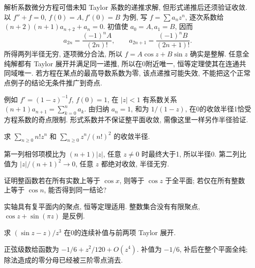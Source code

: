 解析系数微分方程可借未知 Taylor 系数的递推求解, 但形式递推后还须验证收敛. 以 $f''+f=0$, $f(0)=A,f'(0)=B$ 为例, 写 $f=\sum a_nz^n$, 逐次系数给 $(n+2)(n+1)a_{n+2}+a_n=0$. 初值使 $a_0=A,a_1=B$, 因而
\[
a_{2n}=\frac{(-1)^nA}{(2n)!},\qquad
 a_{2n+1}=\frac{(-1)^nB}{(2n+1)!}.
\]
所得两列半径无穷, 逐项微分合法, 所以 $f=A\cos z+B\sin z$ 确实是整解. 任意全纯解都有 Taylor 展开并满足同一递推, 所以在0附近唯一, 恒等定理使其在连通共同域唯一. 若方程在某点的最高导数系数为零, 该点递推可能失效, 不能把这个正常点例子的结论无条件推广到奇点.

例如 $f'=(1-z)^{-1}f$, $f(0)=1$, 在 $|z|<1$ 有系数关系 $(n+1)a_{n+1}=\sum_{k=0}^na_k$. 由归纳 $a_n=1$, 和为 $1/(1-z)$, 在0的收敛半径1恰受方程系数的奇点限制. 形式系数并不保证整平面收敛, 需像这里一样另作半径验证.

\begin{exercise}
求 $\sum_{n\ge0}n!z^n$ 和 $\sum_{n\ge0}z^n/(n!)^2$ 的收敛半径.
\end{exercise}
\begin{solution}
第一列相邻项模比为 $(n+1)|z|$, 任意 $z\ne0$ 时最终大于1, 所以半径0. 第二列比值为 $|z|/(n+1)^2\to0$, 任意 $z$ 都绝对收敛, 半径无穷.
\end{solution}
\begin{exercise}
证明整函数若在所有实数上等于 $\cos x$, 则等于 $\cos z$ 于全平面; 若仅在所有整数上等于 $\cos n$, 能否得到同一结论?
\end{exercise}
\begin{solution}
实轴具有复平面内的聚点, 恒等定理适用. 整数集合没有有限聚点, $\cos z+\sin(\pi z)$ 是反例.
\end{solution}
\begin{exercise}
求 $(\sin z-z)/z^3$ 在0的连续补值与前两项 Taylor 展开.
\end{exercise}
\begin{solution}
正弦级数给函数为 $-1/6+z^2/120+O(z^4)$. 补值为 $-1/6$, 补后在整个平面全纯; 除法造成的零分母已经被三阶零点消去.
\end{solution}
